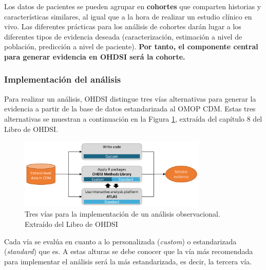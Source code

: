 Los datos de pacientes se pueden agrupar en \textbf{cohortes} que comparten historias y características similares, al igual que a la hora de realizar un estudio clínico en vivo. Las diferentes  prácticas para los análisis de cohortes darán lugar a los diferentes tipos de evidencia deseada (caracterización, estimación a nivel de población, predicción a nivel de paciente). \textbf{Por tanto, el componente central para generar evidencia en OHDSI será la cohorte.}


\subsubsection{Implementación del análisis}

Para realizar un análisis, OHDSI distingue tres vías alternativas para generar la evidencia a partir de la base de datos estandarizada al OMOP CDM. Estas tres alternativas se muestran a continuación en la Figura \ref{fig:analysisImplementations}, extraída del capítulo 8 del Libro de OHDSI.

\begin{figure}[H]
    \centering
    \includegraphics[width=0.80\textwidth]{figures/analysisImplementations.png}
     \caption{Tres vías para la implementación de un análisis observacional. Extraído del Libro de OHDSI \cite{OHDSIbook}}
    \label{fig:analysisImplementations}
\end{figure}

Cada vía se evalúa en cuanto a lo personalizada (\textit{custom}) o estandarizada (\textit{standard}) que es. A estas alturas se debe conocer que la vía más recomendada para implementar el análisis será la más estandarizada, es decir, la tercera vía.

